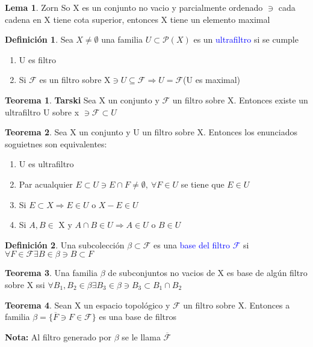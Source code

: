\documentclass{article}
\theoremstyle{definition}
\newtheorem{definition}{Definición}[section]
\newtheorem{theorem}{Teorema}[section]
\newtheorem{lemma}{Lema}[section]
\begin{document}
\begin{lemma}{Zorn}
	So X es un conjunto no vacio y parcialmente ordenado $\ni$ cada cadena en X tiene cota superior, entonces X tiene un elemento maximal
\end{lemma}
\begin{definition}
	Sea $X\neq \emptyset$ una familia $U\subset\mathcal{P}(X)$ es un \textcolor{blue}{ultrafiltro} si se cumple
	\begin{enumerate}
		\item U es filtro
		\item Si $\mathcal{F}$ es un filtro sobre X$\ni U\subseteq\mathcal{F}\Rightarrow U=\mathcal{F}$(U es maximal)
	\end{enumerate}
\end{definition}
\begin{theorem}{\textbf{Tarski}}
	Sea X un conjunto y $\mathcal{F}$ un filtro sobre X. Entonces existe un ultrafiltro U sobre x $\ni \mathcal{F}\subset U$
\end{theorem}
\begin{theorem}
	Sea X un conjunto y U un filtro sobre X. Entonces los enunciados soguietnes son equivalentes:
	\begin{enumerate}
		\item U es ultrafiltro
		\item Par acualquier $E\subset U\ni E\cap F\neq \emptyset,\ \forall F\in U$ se tiene que $E\in U$
		\item Si $E\subset X\Rightarrow E\in U$ o $X-E\in U$
		\item Si $A, B\in$ X y $ A\cap B\in U\Rightarrow A\in U$ o $ B\in U$
	\end{enumerate}
\end{theorem}
\begin{definition}
	Una subcolección $\beta\subset\mathcal{F}$ es una \textcolor{blue}{base del filtro $\mathcal{F}$} si $\forall F\in \mathcal{F} \exists B \in \beta\ni B\subset F$
\end{definition}
\begin{theorem}
	Una familia $\beta$ de subconjuntos no vacios de X es base de algún filtro sobre X ssi $\forall B_1,B_2 \in \beta\exists B_3\in\beta\ni B_3\subset B_1\cap B_2$
\end{theorem}
\begin{theorem}
	Sean X un espacio topológico y $\mathcal{F}$ un filtro sobre X. Entonces a familia $\beta=\{\overline{F}\ni F\in \mathcal{F}\}$ es una base de filtros
\end{theorem}
\textbf{Nota: } Al filtro generado por $\beta$ se le llama $\overline{\mathcal{F}}$
\end{document}
